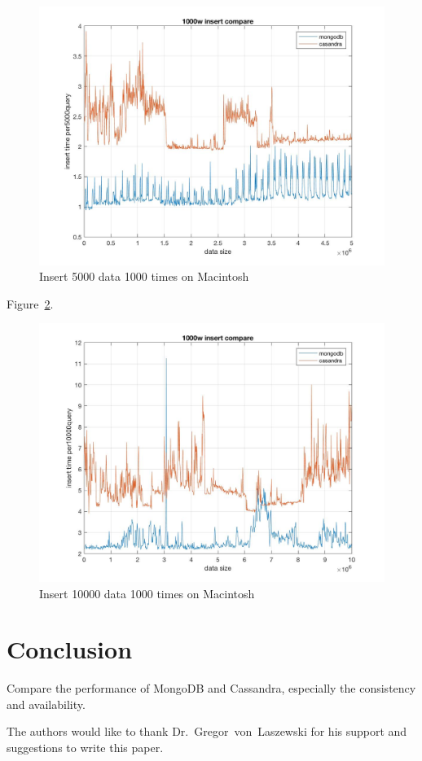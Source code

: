 \begin{figure}[!ht]
  \centering\includegraphics[width=\columnwidth]{images/insert_comp_5000.jpg}
  \caption{Insert 5000 data 1000 times on Macintosh}\label{f:fly}
\end{figure}

Figure~\ref{f:fly}.

\begin{figure}[!ht]
  \centering\includegraphics[width=\columnwidth]{images/insert_comp_10000.jpg}
  \caption{Insert 10000 data 1000 times on Macintosh}\label{f:fly}
\end{figure}
\section{Conclusion}
Compare the performance of MongoDB and Cassandra, especially the consistency 
and availability.

\begin{acks}

  The authors would like to thank Dr.~Gregor~von~Laszewski for his
  support and suggestions to write this paper.

\end{acks}


 

